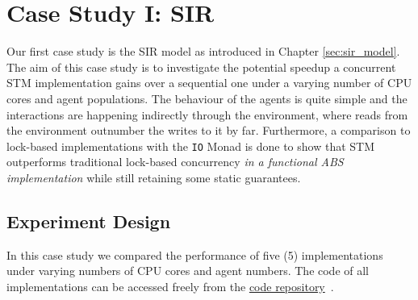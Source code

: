 \section{Case Study I: SIR}
\label{sec:concurrent_sir}
Our first case study is the SIR model as introduced in Chapter \ref{sec:sir_model}. The aim of this case study is to investigate the potential speedup a concurrent STM implementation gains over a sequential one under a varying number of CPU cores and agent populations. The behaviour of the agents is quite simple and the interactions are happening indirectly through the environment, where reads from the environment outnumber the writes to it by far. Furthermore, a comparison to lock-based implementations with the \texttt{IO} Monad is done to show that STM outperforms traditional lock-based concurrency \textit{in a functional ABS implementation} while still retaining some static guarantees.

\subsection{Experiment Design}
In this case study we compared the performance of five (5) implementations under varying numbers of CPU cores and agent numbers. The code of all implementations can be accessed freely from the \href{https://github.com/thalerjonathan/haskell-stm-sir}{code repository}~\cite{thaler_stm_sir_repository}.

